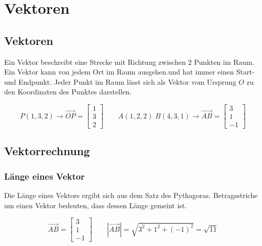 \section{Vektoren}

\graphicspath{ {./images/} }

\subsection{Vektoren}

Ein Vektor beschreibt eine Strecke mit Richtung zwischen 2 Punkten im Raum.
Ein Vektor kann von jedem Ort im Raum ausgehen.und hat immer einen Start- und Endpunkt. 
Jeder Punkt im Raum lässt sich als Vektor vom Ursprung $O$ zu den Koordinaten des Punktes
darstellen.

\begin{equation}
    P (1, 3, 2) \rightarrow \overrightarrow{OP} = \begin{bmatrix}
        1 \\
        3 \\
        2
    \end{bmatrix}
    \qquad A (1, 2, 2) \; B (4, 3, 1) \rightarrow \overrightarrow{AB} = \begin{bmatrix}
        3 \\
        1 \\
        -1
    \end{bmatrix}
\end{equation}

\subsection{Vektorrechnung}

\subsubsection{Länge eines Vektor}

Die Länge eines Vektors ergibt sich aus dem Satz des Pythagoras.
Betragsstriche um einen Vektor bedeuten, dass dessen Länge gemeint ist.

\begin{equation}
    \overrightarrow{AB} = \begin{bmatrix}
        3 \\
        1 \\
        -1
    \end{bmatrix}
    \qquad | \overrightarrow{AB} | = \sqrt{3^2 + 1^2 + (-1)^2} = \sqrt{11}
\end{equation}

